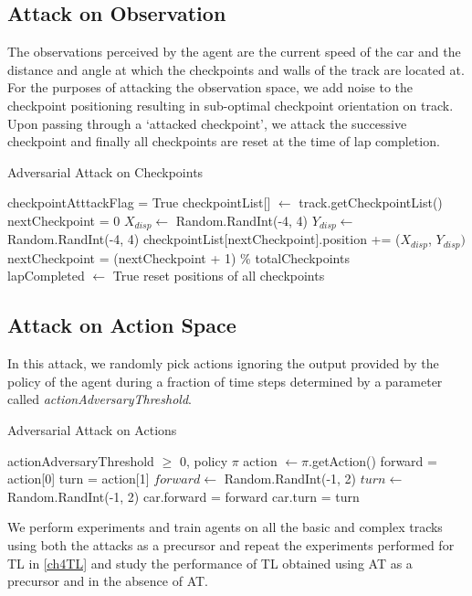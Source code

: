 \subsection{Attack on Observation} \label{at-obs}

The observations perceived by the agent are the current speed of the
car and the distance and angle at which the checkpoints and walls of
the track are located at. For the purposes of attacking the
observation space, we add noise to the checkpoint positioning
resulting in sub-optimal checkpoint orientation on track. Upon passing
through a `attacked checkpoint', we attack the successive checkpoint
and finally all checkpoints are reset at the time of lap completion.
\begin{algorithm}[H]
\caption{Adversarial Attack on Checkpoints}\label{alg:cap}
\begin{algorithmic}
\Require checkpointAtttackFlag = True
\State checkpointList[] $\gets$ track.getCheckpointList()
\State nextCheckpoint = 0
\State $X_{disp} \gets$ Random.RandInt(-4, 4)
\State $Y_{disp} \gets$ Random.RandInt(-4, 4)
\State checkpointList[nextCheckpoint].position += ($X_{disp}$, $Y_{disp})$\\
\State nextCheckpoint = (nextCheckpoint + 1) \% totalCheckpoints\\
 
\State lapCompleted $\gets$ True
\State reset positions of all checkpoints
\EndIf
\EndWhile
\end{algorithmic}
\end{algorithm}

\subsection{Attack on Action Space} \label{at-action}

In this attack, we randomly pick actions ignoring the output provided
by the policy of the agent during a fraction of time steps determined
by a parameter called \textit{actionAdversaryThreshold}.

\begin{algorithm}[H]
\caption{Adversarial Attack on Actions}\label{alg:cap}
\begin{algorithmic}
\Require actionAdversaryThreshold $\geq$ 0, policy $\pi$
\State action $\gets \pi$.getAction() 
\State forward = action[0]
\State turn = action[1]
\State $forward \gets$ Random.RandInt(-1, 2)
\State $turn \gets$ Random.RandInt(-1, 2)
\EndIf
\State car.forward = forward
\State car.turn = turn
\end{algorithmic}
\end{algorithm}

We perform experiments and train agents on all the basic and complex
tracks using both the attacks as a precursor and repeat the
experiments performed for TL in \ref{ch4TL} and study the performance
of TL obtained using AT as a precursor and in the absence of AT.

